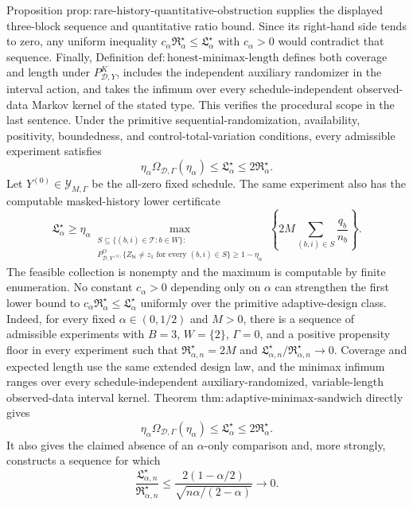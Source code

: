 Proposition \(\mathrm{prop:rare\text{-}history\text{-}quantitative\text{-}obstruction}\) supplies the displayed three-block sequence and quantitative ratio bound.  Since its right-hand side tends to zero, any uniform inequality \(c_\alpha\mathfrak R_\alpha^\star\le\mathfrak L_\alpha^\star\) with \(c_\alpha>0\) would contradict that sequence.  Finally, Definition \(\mathrm{def:honest\text{-}minimax\text{-}length}\) defines both coverage and length under \(P^K_{\mathcal D,Y}\), includes the independent auxiliary randomizer in the interval action, and takes the infimum over every schedule-independent observed-data Markov kernel of the stated type.  This verifies the procedural scope in the last sentence.
Under the primitive sequential-randomization, availability, positivity, boundedness, and control-total-variation conditions, every admissible experiment satisfies
\[
 \eta_\alpha\Omega_{\mathcal D,\Gamma}(\eta_\alpha)
 \le \mathfrak L_\alpha^\star
 \le 2\mathfrak R_\alpha^\star.
\]
Let \(Y^{(0)}\in\mathcal Y_{M,\Gamma}\) be the all-zero fixed schedule. The same experiment also has the computable masked-history lower certificate
\[
 \mathfrak L_\alpha^\star
 \ge \eta_\alpha
 \max_{\substack{S\subseteq\{(b,i)\in\mathcal T:b\in W\}:\\ P^O_{\mathcal D,Y^{(0)}}\{Z_{bi}\ne z_1\text{ for every }(b,i)\in S\}\ge1-\eta_\alpha}}
 \left\{2M\sum_{(b,i)\in S}\frac{q_b}{n_b}\right\}.
\]
The feasible collection is nonempty and the maximum is computable by finite enumeration. No constant \(c_\alpha>0\) depending only on \(\alpha\) can strengthen the first lower bound to \(c_\alpha\mathfrak R_\alpha^\star\le\mathfrak L_\alpha^\star\) uniformly over the primitive adaptive-design class. Indeed, for every fixed \(\alpha\in(0,1/2)\) and \(M>0\), there is a sequence of admissible experiments with \(B=3\), \(W=\{2\}\), \(\Gamma=0\), and a positive propensity floor in every experiment such that \(\mathfrak R_{\alpha,n}^\star=2M\) and \(\mathfrak L_{\alpha,n}^\star/\mathfrak R_{\alpha,n}^\star\to0\). Coverage and expected length use the same extended design law, and the minimax infimum ranges over every schedule-independent auxiliary-randomized, variable-length observed-data interval kernel.
Theorem \(\mathrm{thm:adaptive\text{-}minimax\text{-}sandwich}\) directly gives
\[
 \eta_\alpha\Omega_{\mathcal D,\Gamma}(\eta_\alpha)
 \le\mathfrak L_\alpha^\star
 \le2\mathfrak R_\alpha^\star.
\]
It also gives the claimed absence of an \(\alpha\)-only comparison and, more strongly, constructs a sequence for which
\[
 \frac{\mathfrak L_{\alpha,n}^\star}{\mathfrak R_{\alpha,n}^\star}
 \le
 \frac{2(1-\alpha/2)}{\sqrt{n\alpha/(2-\alpha)}}
 \longrightarrow0.
\]

